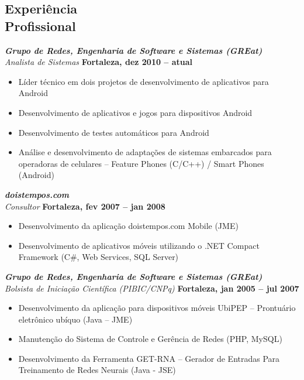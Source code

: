 \documentclass[margin, 10pt]{res} %
\begin{document}
\begin{resume}
 

 
\section{Experiência \\ Profissional}

{\sl\bf Grupo de Redes, Engenharia de Software e Sistemas (GREat)}  \\
{\sl Analista de Sistemas} \hfill {\bf Fortaleza, dez 2010 -- atual}
\begin{itemize} \itemsep -2pt %
\item Líder técnico em dois projetos de desenvolvimento de aplicativos para Android
\item Desenvolvimento de aplicativos e jogos para dispositivos Android
\item Desenvolvimento de testes automáticos para Android
\item Análise e desenvolvimento de adaptações de sistemas embarcados para operadoras de celulares – Feature Phones (C/C++) / Smart Phones (Android)
\end{itemize}
 
{\sl\bf doistempos.com} \\
{\sl Consultor} \hfill {\bf Fortaleza, fev 2007 -- jan 2008}
\begin{itemize} \itemsep -2pt 
\item Desenvolvimento da aplicação doistempos.com Mobile (JME)
\item Desenvolvimento de aplicativos móveis utilizando o .NET Compact Framework (C\#, Web Services, SQL Server)
\end{itemize} 


{\sl\bf Grupo de Redes, Engenharia de Software e Sistemas (GREat)}  \\
{\sl Bolsista de Iniciação Científica (PIBIC/CNPq)} \hfill {\bf Fortaleza, jan 2005 -- jul 2007}
\begin{itemize} \itemsep -2pt %
\item Desenvolvimento da aplicação para dispositivos móveis UbiPEP – Prontuário eletrônico ubíquo (Java – JME)
\item Manutenção do Sistema de Controle e Gerência de Redes (PHP, MySQL)
\item Desenvolvimento da Ferramenta GET-RNA – Gerador de Entradas Para Treinamento de Redes Neurais (Java - JSE)
\end{itemize}


\end{resume}
\end{document}
